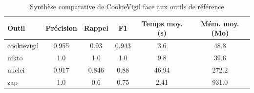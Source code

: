 \begin{table}[htpb]
\centering
\caption{Synthèse comparative de CookieVigil face aux outils de référence}
\label{tab:comparaison-outils}
\small
\begin{tabular}{|l|c|c|c|c|c|}
\hline
\textbf{Outil} & \textbf{Précision} & \textbf{Rappel} & \textbf{F1} & \textbf{Temps moy. (s)} & \textbf{Mém. moy. (Mo)} \\
\hline
cookievigil & 0.955 & 0.93 & 0.943 & 3.6 & 48.8 \\
nikto & 1.0 & 1.0 & 1.0 & 9.8 & 39.6 \\
nuclei & 0.917 & 0.846 & 0.88 & 46.94 & 272.2 \\
zap & 1.0 & 0.6 & 0.75 & 2.41 & 931.0 \\
\hline
\end{tabular}
\end{table}